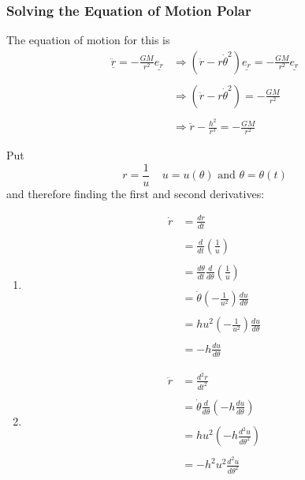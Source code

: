 \subsubsection{Solving the Equation of Motion Polar}
The equation of motion for this is
$$
	\begin{aligned}
		\underline{\ddot{r}} = -\frac{GM}{r^{2}}\underline{e_{r}} & \Rightarrow (\ddot{r} - r\dot{\theta}^{2})\underline{e_{r}} = -\frac{GM}{r^{2}}\underline{e_{r}} \\ \\
		                                                          & \Rightarrow (\ddot{r} - r\dot{\theta}^{2}) = -\frac{GM}{r^{2}}                                   \\ \\
		                                                          & \Rightarrow \ddot{r} - \frac{h^{2}}{r^{3}} = -\frac{GM}{r^{2}}
	\end{aligned}
$$
\clearpage
\begin{note}
	Put
	$$r = \frac{1}{u} \ \ \ \ \ u = u(\theta) \text{ and } \theta = \theta(t)$$
	and therefore finding the first and second derivatives:
	\begin{enumerate}
		\item $$\begin{aligned}
				      {\dot{r}} & = \frac{dr}{dt}                                               \\ \\
				                & = \frac{d}{dt}\left(\frac{1}{u} \right)                       \\ \\
				                & = \frac{d\theta}{dt}\frac{d}{d\theta}\left(\frac{1}{u}\right) \\ \\
				                & = \dot{\theta}\left(-\frac{1}{u^{2}}\right)\frac{du}{d\theta} \\ \\
				                & = hu^{2}\left(-\frac{1}{u^{2}}\right)\frac{du}{d\theta}       \\ \\
				                & = -h\frac{du}{d\theta}
			      \end{aligned}$$
		\item $$\begin{aligned}
				      {\ddot{r}} & = \frac{d^{2}r}{dt^{2}}                                             \\ \\
				                 & = \dot{\theta}\frac{d}{d\theta}\left( -h \frac{du}{d\theta} \right) \\ \\
				                 & = hu^{2}\left(-h \frac{d^{2}u}{d\theta^{2}}\right)                  \\ \\
				                 & = -h^{2}u^{2}\frac{d^{2}u}{d\theta^{2}}
			      \end{aligned}$$
	\end{enumerate}
\end{note}

